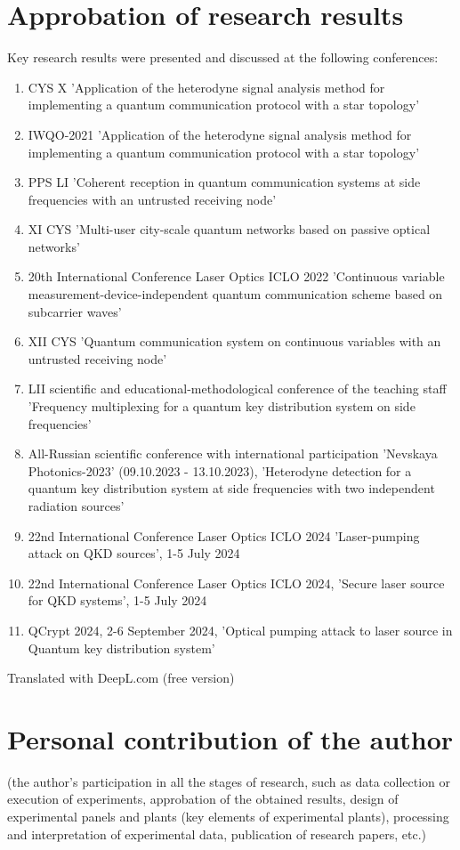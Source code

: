 \section*{Approbation of research results}
Key research results were presented and discussed at the following conferences:
\begin{enumerate}
    \item CYS X 'Application of the heterodyne signal analysis method for implementing a quantum communication protocol with a star topology'
    \item IWQO-2021 'Application of the heterodyne signal analysis method for implementing a quantum communication protocol with a star topology'
    \item PPS LI 'Coherent reception in quantum communication systems at side frequencies with an untrusted receiving node'
    \item XI CYS 'Multi-user city-scale quantum networks based on passive optical networks'
    \item 20th International Conference Laser Optics ICLO 2022 'Continuous variable measurement-device-independent quantum communication scheme based on subcarrier waves'
    \item XII CYS 'Quantum communication system on continuous variables with an untrusted receiving node'
    \item LII scientific and educational-methodological conference of the teaching staff 'Frequency multiplexing for a quantum key distribution system on side frequencies'
    \item All-Russian scientific conference with international participation 'Nevskaya Photonics-2023' (09.10.2023 - 13.10.2023), 'Heterodyne detection for a quantum key distribution system at side frequencies with two independent radiation sources'
    \item 22nd International Conference Laser Optics ICLO 2024 'Laser-pumping attack on QKD sources', 1-5 July 2024
    \item 22nd International Conference Laser Optics ICLO 2024, 'Secure laser source for QKD systems', 1-5 July 2024
    \item QCrypt 2024, 2-6 September 2024, 'Optical pumping attack to laser source in Quantum key distribution system'
\end{enumerate}

Translated with DeepL.com (free version)
\section*{Personal contribution of the author}
(the author's participation in all the stages of research, such as data collection or execution of experiments, approbation of the obtained results, design of experimental panels and plants (key elements of experimental plants), processing and interpretation of experimental data, publication of research papers, etc.)

